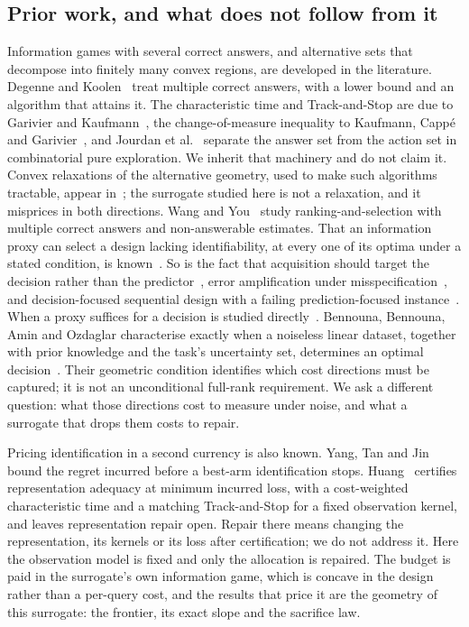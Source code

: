\subsection{Prior work, and what does not follow from it}

Information games with several correct answers, and alternative sets that decompose into
finitely many convex regions, are developed in the literature. Degenne and
Koolen~\cite{degenne2019} treat multiple correct answers, with a lower bound and an algorithm
that attains it. The characteristic time and Track-and-Stop are due to Garivier and
Kaufmann~\cite{garivier2016}, the change-of-measure inequality to Kaufmann, Capp\'e and
Garivier~\cite{kaufmann2016}, and Jourdan et al.~\cite{jourdan2021} separate the answer set from
the action set in combinatorial pure exploration. We inherit that machinery and do not claim
it. Convex relaxations of the alternative geometry, used to make such algorithms tractable,
appear in~\cite{shukla2024}; the surrogate studied here is not a relaxation, and it misprices in
both directions. Wang and You~\cite{wangyou2026} study ranking-and-selection with multiple
correct answers and non-answerable estimates. That an information proxy can select a design
lacking identifiability, at every one of its optima under a stated condition, is
known~\cite{overstall2022}. So is the fact that acquisition should target the decision rather
than the predictor~\cite{filstroff2021}, error amplification under
misspecification~\cite{tang2026}, and decision-focused sequential design with a failing
prediction-focused instance~\cite{wan2026}. When a proxy suffices for a decision is studied
directly~\cite{schutte2026}. Bennouna, Bennouna, Amin and Ozdaglar characterise exactly when a
noiseless linear dataset, together with prior knowledge and the task's uncertainty set,
determines an optimal decision~\cite{bennouna2025,bennouna2026}. Their geometric condition
identifies which cost directions must be captured; it is not an unconditional full-rank
requirement. We ask a different question: what those directions cost to
measure under noise, and what a surrogate that drops them costs to repair.

Pricing identification in a second currency is also known. Yang, Tan and Jin~\cite{yang2024}
bound the regret incurred before a best-arm identification stops. Huang~\cite{huang2026}
certifies representation adequacy at minimum incurred loss, with a cost-weighted
characteristic time and a matching Track-and-Stop for a fixed observation kernel, and leaves
representation repair open. Repair there means changing the representation, its kernels or its
loss after certification; we do not address it. Here the observation model is fixed and only the
allocation is repaired. The budget is paid in the surrogate's own information game, which is
concave in the design rather than a per-query cost, and the results that price it are the
geometry of this surrogate: the frontier, its exact slope and the sacrifice law.

